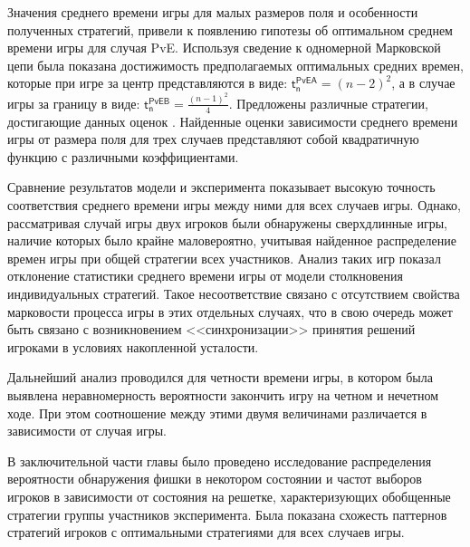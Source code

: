 Значения среднего времени игры для малых размеров поля и особенности полученных стратегий, привели к появлению гипотезы
об оптимальном среднем времени игры для случая PvE. Используя сведение к одномерной Марковской цепи была показана
достижимость предполагаемых оптимальных средних времен, которые при игре за центр представляются в виде: $\boldsymbol{\mathsf{t_n^{PvE A}}} = (n-2)^2$, а в случае
игры за границу в виде: $\boldsymbol{\mathsf{t_n^{PvE B}}} = \frac{(n-1)^2}{4}$. 
Предложены различные стратегии, достигающие данных оценок \cite{confbib1}. Найденные оценки зависимости среднего времени игры 
от размера поля для трех случаев представляют собой квадратичную функцию с различными коэффициентами.

Сравнение результатов модели и эксперимента показывает высокую точность соответствия среднего времени игры между ними для всех случаев игры.
Однако, рассматривая случай игры двух игроков были обнаружены сверхдлинные игры, наличие которых было крайне маловероятно,
учитывая найденное распределение времен игры при общей стратегии всех участников. 
Анализ таких игр показал отклонение статистики среднего времени игры от модели столкновения индивидуальных стратегий.
Такое несоответствие связано с отсутствием свойства марковости процесса игры в этих отдельных случаях,
что в свою очередь может быть связано с возникновением <<синхронизации>> принятия решений игроками
в условиях накопленной усталости.

Дальнейший анализ проводился для четности времени игры, в котором была выявлена неравномерность 
вероятности закончить игру на четном и нечетном ходе. При этом соотношение между этими двумя величинами
различается в зависимости от случая игры. 

В заключительной части главы было проведено исследование распределения вероятности обнаружения фишки в некотором состоянии и 
частот выборов игроков в зависимости от состояния на решетке, характеризующих обобщенные стратегии группы участников эксперимента.
Была показана схожесть паттернов стратегий игроков с оптимальными стратегиями для всех случаев игры.




